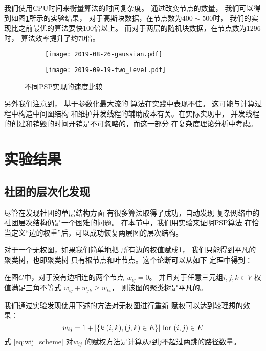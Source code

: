 我们使用CPU时间来衡量算法的时间复杂度。
通过改变节点的数量，
我们可以得到如图\ref{fig:esc}所示的实验结果，
对于高斯块数据，在节点数为$400\sim 500$时，
我们的实现比之前最优的算法要快100倍以上。
而对于两层的随机块数据，在节点数为1296时，
算法效率提升了约70倍。
\begin{figure}
	\centering
	\begin{subfigure}{0.45\textwidth}
		\texttt{[image: 2019-08-26-gaussian.pdf]}
	\end{subfigure}
	\begin{subfigure}{0.45\textwidth}
		\texttt{[image: 2019-09-19-two\_level.pdf]}
	\end{subfigure}
	\caption{
  不同PSP实现的速度比较}\label{fig:esc}
\end{figure}

另外我们注意到，
基于参数化最大流的
算法\citep{kolmogorov}在实践中表现不佳。
这可能与计算过程中构造中间图结构
和维护并发线程的辅助成本有关。在实际实现中，
并发线程的创建和销毁的时间开销是不可忽略的，而这一部分
在复杂度理论分析中考虑。

\section{实验结果}
\subsection{社团的层次化发现}
\label{subsec:cd}
尽管在发现社团的单层结构方面
有很多算法取得了成功，自动发现
复杂网络中的社团层次结构仍是一个困难的问题。
在本节中，我们用实验来证明PSP算法
在恰当定义“边的权重”后，可以成功恢复两层图的层次结构。

对于一个无权图，如果我们简单地把
所有边的权值赋成1，
我们只能得到平凡的聚类树，也即聚类树
只有根节点和叶节点。这个论断可以从如下
定理中得到：
\begin{theorem}\label{thm:triangle}
  在图$G$中，对于没有边相连的两个节点 $w_{ij}=0$。
  并且对于任意三元组$i,j,k \in V$ 权值满足三角不等式 
  $w_{ij} + w_{jk} \geq w_{ki}$，
  则该图的聚类树是平凡的。
\end{theorem}
  
我们通过实验发现使用下述的方法对无权图进行重新
赋权可以达到较理想的效果：
\begin{equation}\label{eq:wij_scheme}
    w_{ij} = 1 + \lvert\{k | (i,k),(j,k) \in E \}\rvert \textrm{ for } (i,j) \in E
\end{equation}
式 \eqref{eq:wij_scheme} 对$w_{ij}$
的赋权方法是计算从$i$到$j$不超过两跳的路径数量。

